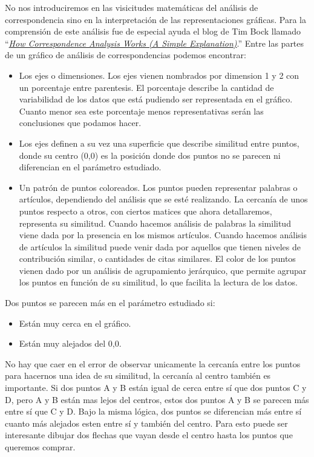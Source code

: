 \documentclass[
]{article}
\providecommand{\tightlist}{%
  \setlength{\itemsep}{0pt}\setlength{\parskip}{0pt}}
\begin{document}
No nos introduciremos en las visicitudes matemáticas del análisis de
correspondencia sino en la interpretación de las representaciones
gráficas. Para la comprensión de este análisis fue de especial ayuda el
blog de Tim Bock llamado
``\emph{\href{https://www.displayr.com/how-correspondence-analysis-works/}{How
Correspondence Analysis Works (A Simple Explanation)}}.'' Entre las
partes de un gráfico de análisis de correspondencias podemos encontrar:

\begin{itemize}
\tightlist
\item
  Los ejes o dimensiones. Los ejes vienen nombrados por dimension 1 y 2
  con un porcentaje entre parentesis. El porcentaje describe la cantidad
  de variabilidad de los datos que está pudiendo ser representada en el
  gráfico. Cuanto menor sea este porcentaje menos representativas serán
  las conclusiones que podamos hacer.
\item
  Los ejes definen a su vez una superficie que describe similitud entre
  puntos, donde su centro (0,0) es la posición donde dos puntos no se
  parecen ni diferencian en el parámetro estudiado.
\item
  Un patrón de puntos coloreados. Los puntos pueden representar palabras
  o artículos, dependiendo del análisis que se esté realizando. La
  cercanía de unos puntos respecto a otros, con ciertos matices que
  ahora detallaremos, representa su similitud. Cuando hacemos análisis
  de palabras la similitud viene dada por la presencia en los mismos
  artículos. Cuando hacemos análisis de artículos la similitud puede
  venir dada por aquellos que tienen niveles de contribución similar, o
  cantidades de citas similares. El color de los puntos vienen dado por
  un análisis de agrupamiento jerárquico, que permite agrupar los puntos
  en función de su similitud, lo que facilita la lectura de los datos.
\end{itemize}

Dos puntos se parecen más en el parámetro estudiado si:

\begin{itemize}
\tightlist
\item
  Están muy cerca en el gráfico.
\item
  Están muy alejados del 0,0.
\end{itemize}

No hay que caer en el error de observar unicamente la cercanía entre los
puntos para hacernos una idea de su similitud, la cercanía al centro
también es importante. Si dos puntos A y B están igual de cerca entre sí
que dos puntos C y D, pero A y B están mas lejos del centros, estos dos
puntos A y B se parecen más entre sí que C y D. Bajo la misma lógica,
dos puntos se diferencian más entre sí cuanto más alejados esten entre
sí y también del centro. Para esto puede ser interesante dibujar dos
flechas que vayan desde el centro hasta los puntos que queremos comprar.
\end{document}
